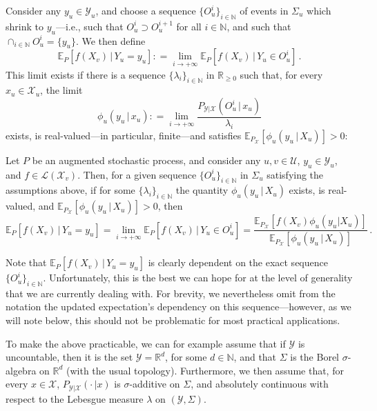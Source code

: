 \documentclass[twoside,11pt]{article}
\newcommand{\nats}{\mathbb{N}}
\newcommand{\reals}{\mathbb{R}}
\newcommand{\realsnonneg}{\reals_{\geq 0}}
\newcommand{\states}{\mathcal{X}}
\newcommand{\observs}{\mathcal{Y}}
\newcommand{\gambles}{\mathcal{L}}
\newcommand{\coloneqq}{:\!=}
\begin{document}
Consider any $y_u\in\observs_u$, and choose a sequence $\{O_u^i\}_{i\in\nats}$ of events in $\Sigma_u$ which shrink to $y_u$---i.e., such that $O_u^i\supset O_u^{i+1}$ for all $i\in\nats$, and such that $\cap_{i\in\nats} O_u^i=\{y_u\}$. We then define
\begin{equation*}
\mathbb{E}_P[f(X_v)\,\vert\,Y_u=y_u] \coloneqq \lim_{i\to+\infty} \mathbb{E}_P[f(X_v)\,\vert\,Y_u\in O_u^i]\,.
\end{equation*}
This limit exists if there is a sequence $\{\lambda_i\}_{i\in\nats}$ in $\realsnonneg$ such that, for every $x_u\in\states_u$, the limit
\begin{equation*}
\phi_u(y_u\,\vert\, x_u) \coloneqq \lim_{i\to+\infty}\frac{P_{\observs\vert\states}(O_u^i\,\vert\, x_u)}{\lambda_i}
\end{equation*}
exists, is real-valued---in particular, finite---and satisfies $\mathbb{E}_{P_\states}[\phi_u(y_u\,\vert\,X_u)]>0$:
\begin{proposition}\label{prop:precise_bayes_rule_densities}
Let $P$ be an augmented stochastic process, and consider any $u,v\in\mathcal{U}$, $y_u\in\observs_u$, and $f\in\gambles(\states_v)$. Then, for a given sequence $\{O_u^i\}_{i\in\nats}$ in $\Sigma_u$ satisfying the assumptions above, if for some $\{\lambda_i\}_{i\in\nats}$ the quantity $\phi_u(y_u\,\vert\,X_u)$ exists, is real-valued, and $\mathbb{E}_{P_\states}[\phi_u(y_u\,\vert\,X_u)]>0$, then
\begin{equation}\label{eq:updated_expectation_is_limit}
\mathbb{E}_P[f(X_v)\,\vert\,Y_u=y_u] = \lim_{i\to+\infty} \mathbb{E}_P[f(X_v)\,\vert\,Y_u\in O_u^i] = \frac{\mathbb{E}_{P_\states}[f(X_v)\phi_u(y_u\vert X_u)]}{\mathbb{E}_{P_\states}[\phi_u(y_u\,\vert\,X_u)]}\,.
\end{equation}
\end{proposition}
Note that $\mathbb{E}_P[f(X_v)\,\vert\,Y_u=y_u]$ is clearly dependent on the exact sequence $\{O_u^i\}_{i\in\nats}$. Unfortunately, this is the best we can hope for at the level of generality that we are currently dealing with. %
For brevity, we nevertheless omit from the notation the updated expectation's dependency on this sequence---however, as we will note below, this should not be problematic for most practical applications.

To make the above practicable, we can for example assume that if $\observs$ is uncountable, then it is the set $\observs=\reals^d$, for some $d\in\nats$, and that $\Sigma$ is the Borel $\sigma$-algebra on $\reals^d$ (with the usual topology). Furthermore, we then assume that, for every $x\in\states$, $P_{\observs\vert\states}(\cdot\,\vert x)$ is $\sigma$-additive on $\Sigma$, and absolutely continuous with respect to the Lebesgue measure $\lambda$ on $(\observs,\Sigma)$. 
\end{document}
